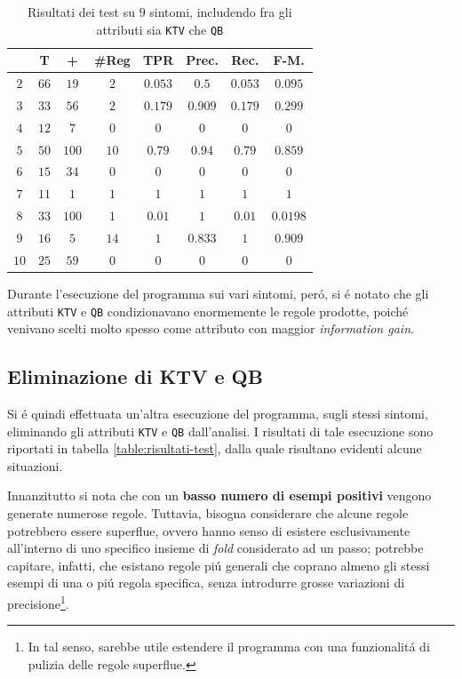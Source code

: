 \documentclass[preprint]{acm_proc_article-sp}
\begin{document}
\begin{table}[h]
\centering
\begin{tabular}{|c|c|c|c|c|c|c|c|} \hline
& \textbf{T} &\textbf{+} &\textbf{\#Reg} &\textbf{TPR} &\textbf{Prec.} &\textbf{Rec.} &\textbf{F-M.}  \\ \hline \hline
$2$	&$66$	&$19$	&$2$	&$0.053$	&$0.5$		&$0.053$	&$0.095$	\\ \hline
$3$ &$33$	&$56$	&$2$	&$0.179$	&$0.909$	&$0.179$	&$0.299$	\\ \hline
$4$ &$12$	&$7$	&$0$	&$0$		&$0$		&$0$		&$0$		\\ \hline
$5$ &$50$	&$100$	&$10$	&$0.79$		&$0.94$		&$0.79$		&$0.859$	\\ \hline
$6$ &$15$	&$34$	&$0$	&$0$		&$0$		&$0$		&$0$		\\ \hline
$7$ &$11$	&$1$	&$1$	&$1$		&$1$		&$1$		&$1$		\\ \hline
$8$ &$33$	&$100$	&$1$	&$0.01$		&$1$		&$0.01$		&$0.0198$	\\ \hline
$9$	&$16$	&$5$	&$14$	&$1$		&$0.833$	&$1$		&$0.909$	\\ \hline
$10$&$25$	&$59$	&$0$	&$0$		&$0$		&$0$		&$0$		\\
\hline\end{tabular}
\caption{Risultati dei test su $9$ sintomi, includendo fra gli attributi sia \texttt{KTV} che \texttt{QB}}
\label{table:risultati-ktv-qb-test}
\end{table}

Durante l'esecuzione del programma sui vari sintomi, per\'o, si \'e notato che gli attributi \verb|KTV| e \verb|QB| condizionavano enormemente le regole prodotte, poich\'e venivano scelti molto spesso come attributo con maggior \textit{information gain}.

\subsection{Eliminazione di KTV e QB}
\label{risultati-no-ktv-qb}
Si \'e quindi effettuata un'altra esecuzione del programma, sugli stessi sintomi, eliminando gli attributi \verb|KTV| e \verb|QB| dall'analisi. I risultati di tale esecuzione sono riportati in tabella \ref{table:risultati-test}, dalla quale risultano evidenti alcune situazioni.

Innanzitutto si nota che con un \textbf{basso numero di esempi positivi} vengono generate numerose regole. Tuttavia, bisogna considerare che alcune regole potrebbero essere superflue, ovvero hanno senso di esistere esclusivamente all'interno di uno specifico insieme di \textit{fold} considerato ad un passo; potrebbe capitare, infatti, che esistano regole pi\'u generali che coprano almeno gli stessi esempi di una o pi\'u regola specifica, senza introdurre grosse variazioni di precisione\footnote{In tal senso, sarebbe utile estendere il programma con una funzionalit\'a di pulizia delle regole superflue.}.
\end{document}
